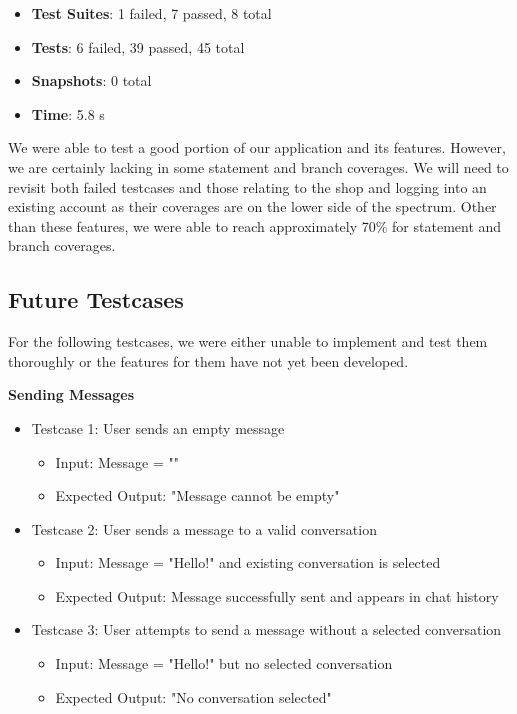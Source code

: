 \begin{itemize}
    \item \textbf{Test Suites}: 1 failed, 7 passed, 8 total
    \item \textbf{Tests}: 6 failed, 39 passed, 45 total
    \item \textbf{Snapshots}: 0 total
    \item \textbf{Time}: 5.8 s
\end{itemize}

We were able to test a good portion of our application and its features. However, we are certainly lacking in some statement and branch coverages. We will need to revisit both failed testcases and those relating to the shop and logging into an existing account as their coverages are on the lower side of the spectrum. Other than these features, we were able to reach approximately 70\% for statement and branch coverages.


\subsection{Future Testcases}
For the following testcases, we were either unable to implement and test them thoroughly or the features for them have not yet been developed.

\textbf{Sending Messages}
\begin{itemize}
    \item Testcase 1: User sends an empty message
    \begin{itemize}
        \item Input: Message = ""
        \item Expected Output: "Message cannot be empty"
    \end{itemize}

    \item Testcase 2: User sends a message to a valid conversation
    \begin{itemize}
        \item Input: Message = "Hello!" and existing conversation is selected
        \item Expected Output: Message successfully sent and appears in chat history
    \end{itemize}

    \item Testcase 3: User attempts to send a message without a selected conversation
    \begin{itemize}
        \item Input: Message = "Hello!" but no selected conversation
        \item Expected Output: "No conversation selected"
    \end{itemize}
\end{itemize}

